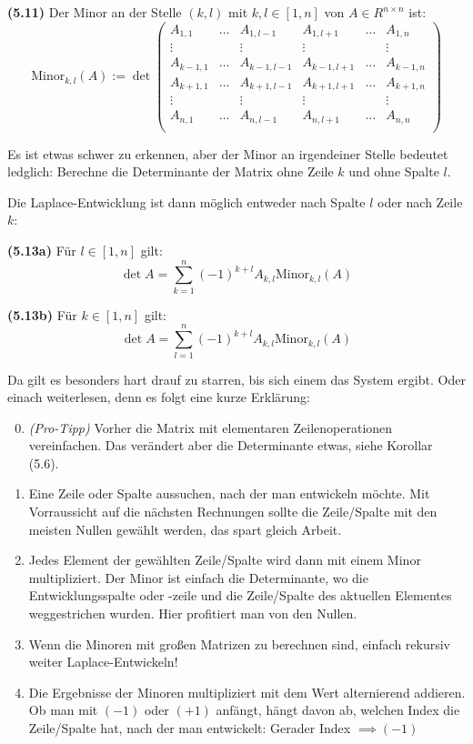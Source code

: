 \documentclass[11pt]{scrartcl}
\newlength{\hangwidth}
\newcommand{\skript}[1]{\settowidth{\hangwidth}{\textbf{(#1)} }\hangpara{\hangwidth}{1}\textbf{(#1)} }%
\begin{document}
\skript{5.11} Der Minor an der Stelle $(k,l)$ mit $k,l \in [1,n]$ von $A \in R^{n \times n}$ ist: \\
$$\textrm{Minor}_{k,l}(A) := \det \begin{pmatrix}
A_{1,1} & \ldots & A_{1,l-1} & A_{1,l+1} & \ldots & A_{1,n} \\
\vdots & & \vdots & \vdots & & \vdots \\
A_{k-1,1} & \ldots & A_{k-1,l-1} & A_{k-1,l+1} & \ldots & A_{k-1,n} \\
A_{k+1,1} & \ldots & A_{k+1,l-1} & A_{k+1,l+1} & \ldots & A_{k+1,n} \\
\vdots & & \vdots & \vdots & & \vdots \\
A_{n,1} & \ldots & A_{n,l-1} & A_{n,l+1} & \ldots & A_{n,n} \\
\end{pmatrix}$$

Es ist etwas schwer zu erkennen, aber der Minor an irgendeiner Stelle bedeutet ledglich: Berechne die Determinante der Matrix ohne Zeile $k$ und ohne Spalte $l$.

Die Laplace-Entwicklung ist dann möglich entweder nach Spalte $l$ oder nach Zeile $k$:

\skript{5.13a} Für $l \in [1,n]$ gilt: \\
$$\det A = \sum_{k=1}^n (-1)^{k+l} A_{k,l} \textrm{Minor}_{k,l}(A)$$

\skript{5.13b} Für $k \in [1,n]$ gilt: \\
$$\det A = \sum_{l=1}^n (-1)^{k+l} A_{k,l} \textrm{Minor}_{k,l}(A)$$

Da gilt es besonders hart drauf zu starren, bis sich einem das System ergibt. Oder einach weiterlesen, denn es folgt eine kurze Erklärung:

\begin{enumerate}
\setcounter{enumi}{-1}
\item \textit{(Pro-Tipp)} Vorher die Matrix mit elementaren Zeilenoperationen vereinfachen. Das verändert aber die Determinante etwas, siehe Korollar (5.6).
\item Eine Zeile oder Spalte aussuchen, nach der man entwickeln möchte. Mit Vorraussicht auf die nächsten Rechnungen sollte die Zeile/Spalte mit den meisten Nullen gewählt werden, das spart gleich Arbeit.
\item Jedes Element der gewählten Zeile/Spalte wird dann mit einem Minor multipliziert. Der Minor ist einfach die Determinante, wo die Entwicklungsspalte oder -zeile und die Zeile/Spalte des aktuellen Elementes weggestrichen wurden. Hier profitiert man von den Nullen.
\item Wenn die Minoren mit großen Matrizen zu berechnen sind, einfach rekursiv weiter Laplace-Entwickeln!
\item Die Ergebnisse der Minoren multipliziert mit dem Wert alternierend addieren. Ob man mit $(-1)$ oder $(+1)$ anfängt, hängt davon ab, welchen Index die Zeile/Spalte hat, nach der man entwickelt: Gerader Index $\implies (-1)$
\end{enumerate}
\end{document}
